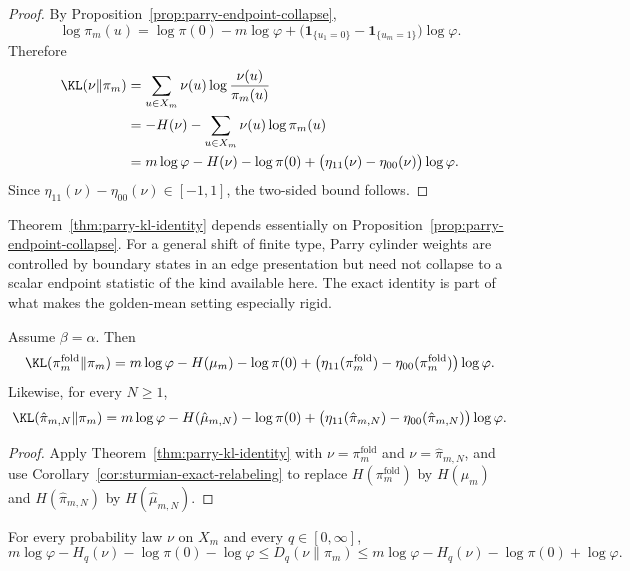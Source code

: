 \begin{proof}
By Proposition~\ref{prop:parry-endpoint-collapse},
\[
\log \pi_m(u)
=
\log\pi(0)-m\log\varphi
{}+\bigl(\mathbf{1}_{\{u_1=0\}}-\mathbf{1}_{\{u_m=1\}}\bigr)\log\varphi.
\]
Therefore
\[
\begin{aligned}
\KL(\nu\|\pi_m)
&=
\sum_{u\in X_m}\nu(u)\log\frac{\nu(u)}{\pi_m(u)}\\
&=
-H(\nu)-\sum_{u\in X_m}\nu(u)\log\pi_m(u)\\
&=
m\log\varphi-H(\nu)-\log\pi(0)
{}+\bigl(\eta_{11}(\nu)-\eta_{00}(\nu)\bigr)\log\varphi.
\end{aligned}
\]
Since \(\eta_{11}(\nu)-\eta_{00}(\nu)\in[-1,1]\), the two-sided bound follows.
\end{proof}

\begin{remark}\label{rem:endpoint-collapse-specificity}
Theorem~\ref{thm:parry-kl-identity} depends essentially on
Proposition~\ref{prop:parry-endpoint-collapse}. For a general shift of finite
type, Parry cylinder weights are controlled by boundary states in an edge
presentation but need not collapse to a scalar endpoint statistic of the kind
available here. The exact identity is part of what makes the golden-mean
setting especially rigid.
\end{remark}

\begin{corollary}\label{cor:no-fold-entropy-loss}
Assume \(\beta=\alpha\). Then
\[
\KL(\pi_m^{\mathrm{fold}}\|\pi_m)
=
m\log\varphi-H(\mu_m)-\log\pi(0)
{}+\bigl(\eta_{11}(\pi_m^{\mathrm{fold}})
-\eta_{00}(\pi_m^{\mathrm{fold}})\bigr)\log\varphi.
\]
Likewise, for every \(N\ge 1\),
\[
\KL(\hat\pi_{m,N}\|\pi_m)
=
m\log\varphi-H(\hat\mu_{m,N})-\log\pi(0)
{}+\bigl(\eta_{11}(\hat\pi_{m,N})
-\eta_{00}(\hat\pi_{m,N})\bigr)\log\varphi.
\]
\end{corollary}

\begin{proof}
Apply Theorem~\ref{thm:parry-kl-identity} with
\(\nu=\pi_m^{\mathrm{fold}}\) and \(\nu=\hat\pi_{m,N}\), and use
Corollary~\ref{cor:sturmian-exact-relabeling} to replace
\(H(\pi_m^{\mathrm{fold}})\) by \(H(\mu_m)\) and
\(H(\hat\pi_{m,N})\) by \(H(\hat\mu_{m,N})\).
\end{proof}

\begin{proposition}
\label{prop:parry-renyi-window}
For every probability law \(\nu\) on \(X_m\) and every \(q\in[0,\infty]\),
\[
m\log\varphi-H_q(\nu)-\log\pi(0)-\log\varphi
\le
D_q(\nu\|\pi_m)
\le
m\log\varphi-H_q(\nu)-\log\pi(0)+\log\varphi.
\]
\end{proposition}

